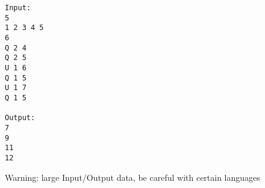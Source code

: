 \begin{verbatim}
Input:
5
1 2 3 4 5
6
Q 2 4
Q 2 5
U 1 6
Q 1 5
U 1 7
Q 1 5

Output:
7
9
11
12

\end{verbatim}

Warning: large Input/Output data, be careful with certain languages